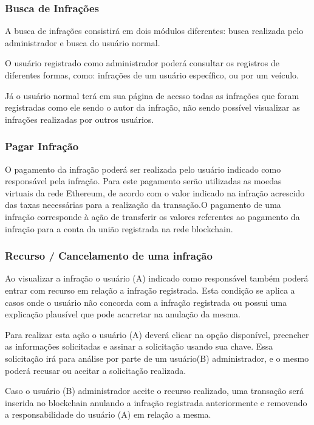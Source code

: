     \subsubsection{Busca de Infrações}
    
        A busca de infrações consistirá em dois módulos diferentes: busca realizada pelo administrador e busca do usuário normal.
        
        O usuário registrado como administrador poderá consultar os registros de diferentes formas, como: infrações de um usuário específico, ou por um veículo.
        
        Já o usuário normal terá em sua página de acesso todas as infrações que foram registradas como ele sendo o autor da infração, não sendo possível visualizar as infrações realizadas por outros usuários.
    
    \subsubsection{Pagar Infração}
    
        O pagamento da infração poderá ser realizada pelo usuário indicado como responsável pela infração. Para este pagamento serão utilizadas as moedas virtuais da rede Ethereum, de acordo com o valor indicado na infração acrescido das taxas necessárias para a realização da transação.O pagamento de uma infração corresponde à ação de transferir os valores referentes ao pagamento da infração para a conta da união registrada na rede blockchain.
    
    
    \subsubsection{Recurso / Cancelamento de uma infração}
    
        Ao visualizar a infração o usuário (A) indicado como responsável também poderá entrar com recurso em relação a infração registrada. Esta condição se aplica a casos onde o usuário não concorda com a infração registrada ou possui uma explicação plausível que pode acarretar na anulação da mesma.
        
        Para realizar esta ação o usuário (A) deverá clicar na opção disponível, preencher as informações solicitadas e assinar a solicitação usando sua chave. Essa solicitação irá para análise por parte de um usuário(B) administrador, e o mesmo poderá recusar ou aceitar a solicitação realizada.
        
        Caso o usuário (B) administrador aceite o recurso realizado, uma transação será inserida no blockchain anulando a infração registrada anteriormente e removendo a responsabilidade do usuário (A) em relação a mesma.
        
